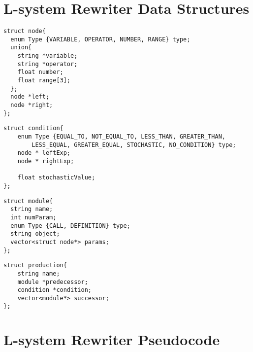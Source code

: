 \chapter{L-system Rewriter Data Structures} \label{rewriter data structures}

\begin{singlespace}

\lstset{language=C}
\lstset{morekeywords=string}

\begin{lstlisting}[frame=single] 
struct node{
  enum Type {VARIABLE, OPERATOR, NUMBER, RANGE} type;
  union{
  	string *variable; 
  	string *operator; 
  	float number;
  	float range[3];
  };
  node *left; 
  node *right; 
};
\end{lstlisting}

\lstset{morekeywords=vector}
\lstset{morekeywords=node}

\begin{lstlisting}[frame=single] 
struct condition{
    enum Type {EQUAL_TO, NOT_EQUAL_TO, LESS_THAN, GREATER_THAN, 
    	LESS_EQUAL, GREATER_EQUAL, STOCHASTIC, NO_CONDITION} type;
    node * leftExp;
    node * rightExp;

    float stochasticValue;
};
\end{lstlisting}

\lstset{morekeywords=condition}

\begin{lstlisting}[frame=single] 
struct module{
  string name;
  int numParam; 
  enum Type {CALL, DEFINITION} type;
  string object; 
  vector<struct node*> params;
};
\end{lstlisting}

\lstset{morekeywords=module}

\begin{lstlisting}[frame=single] 
struct production{
    string name;
    module *predecessor;
    condition *condition;
    vector<module*> successor;
};
\end{lstlisting}

\chapter{L-system Rewriter Pseudocode} \label{rewriter pseudocode}


\end{singlespace}
